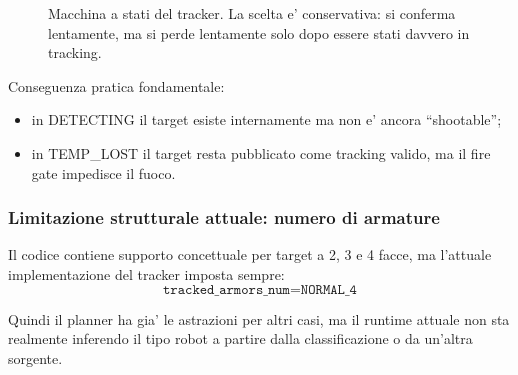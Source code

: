 \documentclass[11pt,a4paper]{article}
\begin{document}
\begin{figure}[ht]
\centering
{}
\caption{Macchina a stati del tracker. La scelta e' conservativa: si conferma lentamente, ma si perde lentamente solo dopo essere stati davvero in tracking.}
\end{figure}

Conseguenza pratica fondamentale:
\begin{itemize}[leftmargin=1.4em]
  \item in DETECTING il target esiste internamente ma non e' ancora ``shootable'';
  \item in TEMP\_LOST il target resta pubblicato come tracking valido, ma il fire gate impedisce il fuoco.
\end{itemize}

\subsubsection{Limitazione strutturale attuale: numero di armature}

Il codice contiene supporto concettuale per target a 2, 3 e 4 facce, ma l'attuale implementazione del tracker imposta sempre:
\begin{equation}
  \texttt{tracked\_armors\_num} = \texttt{NORMAL\_4}
\end{equation}

Quindi il planner ha gia' le astrazioni per altri casi, ma il runtime attuale non sta realmente inferendo il tipo robot a partire dalla classificazione o da un'altra sorgente.
\end{document}
